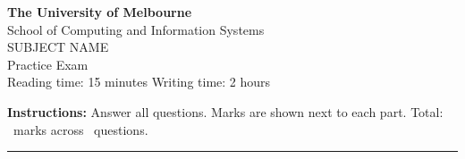 \documentclass[11pt,addpoints]{exam}
\begin{document}
\begin{center}
  {\Large\bfseries The University of Melbourne}\\[2pt]
  School of Computing and Information Systems\\[1em]
  {\Large SUBJECT NAME}\\[4pt]
  {\large Practice Exam}\\[1em]
  Reading time: 15 minutes \quad Writing time: 2 hours
\end{center}
\vspace{1em}
\noindent\textbf{Instructions:} Answer all questions. Marks are shown next to
each part. Total: \numpoints\ marks across \numquestions\ questions.
\vspace{1em}
\hrule
\vspace{1em}
\end{document}
